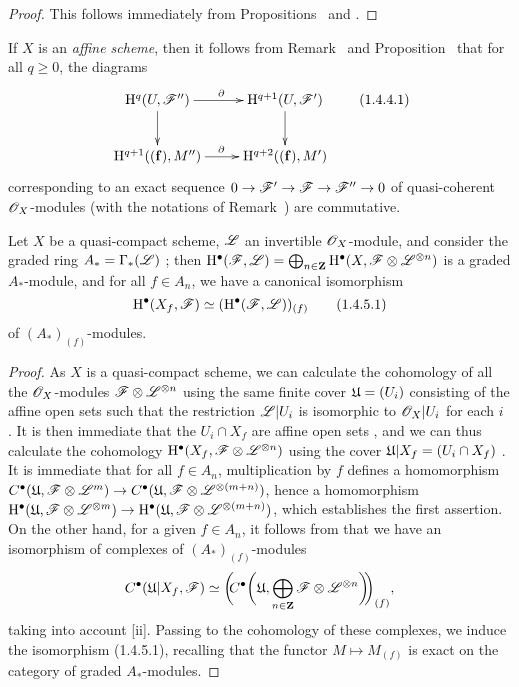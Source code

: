 \begin{proof}
\label{proof-3.1.4.3}
This follows immediately from Propositions~ and .
\end{proof}

\begin{env}[1.4.4]
\label{3.1.4.4}
If $X$ is an \emph{affine scheme}, then it follows from Remark~ and Proposition~ that for all $q\geq 0$, the diagrams
\[
  \xymatrix{
    \HH^q(U,\sh{F}'')\ar[r]^\partial\ar[d] &
    \HH^{q+1}(U,\sh{F}')\ar[d]\\
    \HH^{q+1}((\mathbf{f}),M'')\ar[r]^\partial &
    \HH^{q+2}((\mathbf{f}),M')
  }
  \tag{1.4.4.1}
\]
corresponding to an exact sequence $0\to\sh{F}'\to\sh{F}\to\sh{F}''\to 0$ of quasi-coherent $\mathscr{O}_X$-modules (with the notations of Remark~) are commutative.
\end{env}

\begin{prop}[1.4.5]
\label{3.1.4.5}
Let $X$ be a quasi-compact scheme, $\mathscr{L}$ an invertible $\mathscr{O}_X$-module, and consider the graded ring $A_*=\Gamma_*(\mathscr{L})$ ; then $\mathrm{H}^\bullet(\mathscr{F},\mathscr{L})=\bigoplus_{n\in\mathbf{Z}}\mathrm{H}^\bullet(X,\mathscr{F}\otimes\mathscr{L}^{\otimes n})$ is a graded $A_*$-module, and for all $f\in A_n$, we have a canonical isomorphism
\[
  \mathrm{H}^\bullet(X_f,\mathscr{F})\simeq(\mathrm{H}^\bullet(\mathscr{F},\mathscr{L}))_{(f)}
  \tag{1.4.5.1}
\]
of $(A_*)_{(f)}$-modules.
\end{prop}

\begin{proof}
\label{proof-3.1.4.5}
As $X$ is a quasi-compact scheme, we can calculate the cohomology of all the $\mathscr{O}_X$-modules $\mathscr{F}\otimes\mathscr{L}^{\otimes n}$ using the same finite cover $\mathfrak{U}=(U_i)$ consisting of the affine open sets such that the restriction $\mathscr{L}|U_i$ is isomorphic to $\mathscr{O}_X|U_i$ for each $i$ .
It is then immediate that the $U_i\cap X_f$ are affine open sets , and we can thus calculate the cohomology $\mathrm{H}^\bullet(X_f,\mathscr{F}\otimes\mathscr{L}^{\otimes n})$ using the cover $\mathfrak{U}|X_f=(U_i\cap X_f)$ .
It is immediate that for all $f\in A_n$, multiplication by $f$ defines a homomorphism $C^\bullet(\fk{U},\sh{F}\otimes\sh{L}^m)\to C^\bullet(\fk{U},\sh{F}\otimes\sh{L}^{\otimes(m+n)})$, hence a homomorphism $\HH^\bullet(\fk{U},\sh{F}\otimes\sh{L}^{\otimes m})\to\HH^\bullet(\fk{U},\sh{F}\otimes\sh{L}^{\otimes(m+n)})$, which establishes the first assertion.
On the other hand, for a given $f\in A_n$, it follows from  that we have an isomorphism of complexes of $(A_*)_{(f)}$-modules
\[
  C^\bullet(\mathfrak{U}|X_f,\mathscr{F})\simeq\bigg(\!\!C^\bullet\bigg(\mathfrak{U},\bigoplus_{n\in\mathbf{Z}}\mathscr{F}\otimes\mathscr{L}^{\otimes n}\bigg)\!\!\bigg)_{(f)},
\]
taking into account [ii].
Passing to the cohomology of these complexes, we induce the isomorphism (1.4.5.1), recalling that the functor $M\mapsto M_{(f)}$ is exact on the category of graded $A_*$-modules.
\end{proof}

